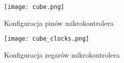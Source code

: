 \begin{figure}[ht!]
    \centering
    \texttt{[image: cube.png]}
    \caption{Konfiguracja pinów mikrokontrolera}
    \label{fig:cube}
\end{figure}

\begin{figure}[ht!]
    \centering
    \texttt{[image: cube\_clocks.png]}
    \caption{Konfiguracja zegarów mikrokontrolera}
    \label{fig:cube_clocks}
\end{figure}



